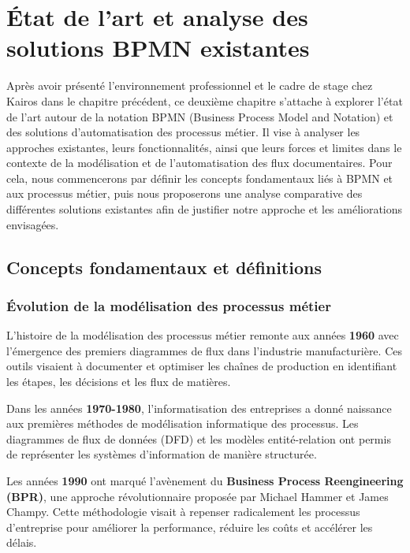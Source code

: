 \chapter{État de l'art et analyse des solutions BPMN existantes}
\label{ch:etat_art_bpmn}

Après avoir présenté l'environnement professionnel et le cadre de stage chez Kairos dans le chapitre précédent, ce deuxième chapitre s'attache à explorer l'état de l'art autour de la notation BPMN (Business Process Model and Notation) et des solutions d'automatisation des processus métier. Il vise à analyser les approches existantes, leurs fonctionnalités, ainsi que leurs forces et limites dans le contexte de la modélisation et de l'automatisation des flux documentaires. Pour cela, nous commencerons par définir les concepts fondamentaux liés à BPMN et aux processus métier, puis nous proposerons une analyse comparative des différentes solutions existantes afin de justifier notre approche et les améliorations envisagées.

\section{Concepts fondamentaux et définitions}

\subsection{Évolution de la modélisation des processus métier}

L'histoire de la modélisation des processus métier remonte aux années \textbf{1960} avec l'émergence des premiers diagrammes de flux dans l'industrie manufacturière. Ces outils visaient à documenter et optimiser les chaînes de production en identifiant les étapes, les décisions et les flux de matières.

Dans les années \textbf{1970-1980}, l'informatisation des entreprises a donné naissance aux premières méthodes de modélisation informatique des processus. Les diagrammes de flux de données (DFD) et les modèles entité-relation ont permis de représenter les systèmes d'information de manière structurée.

Les années \textbf{1990} ont marqué l'avènement du \textbf{Business Process Reengineering (BPR)}, une approche révolutionnaire proposée par Michael Hammer et James Champy. Cette méthodologie visait à repenser radicalement les processus d'entreprise pour améliorer la performance, réduire les coûts et accélérer les délais.

